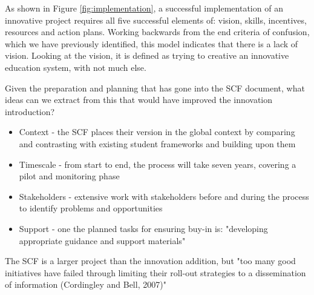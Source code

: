 As shown in Figure \ref{fig:implementation}, a successful implementation of an innovative project requires all five successful elements of: vision, skills, incentives, resources and action plans. Working backwards from the end criteria of confusion, which we have previously identified, this model indicates that there is a lack of vision. Looking at the vision, it is defined as trying to creative an innovative education system, with not much else.

Given the preparation and planning that has gone into the SCF document, what ideas can we extract from this that would have improved the innovation introduction?

\begin{itemize}
\item Context - the SCF places their version in the global context by comparing and contrasting with existing student frameworks and building upon them
\item Timescale - from start to end, the process will take seven years, covering a pilot and monitoring phase
\item Stakeholders - extensive work with stakeholders before and during the process to identify problems and opportunities
\item Support - one the planned tasks for ensuring buy-in is: "developing appropriate guidance and support materials"
\end{itemize}

The SCF is a larger project than the innovation addition, but "too many good initiatives have failed through limiting their roll-out strategies to a dissemination of information (Cordingley and Bell, 2007)" \cite{ADEC2016}

\theendnotes
